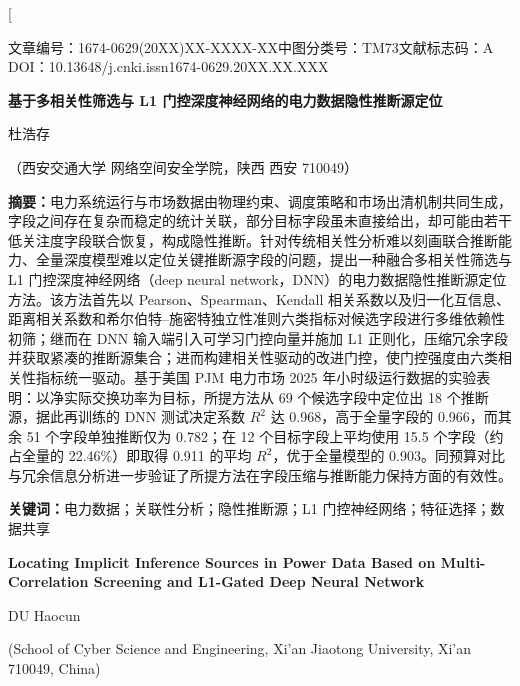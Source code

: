 \documentclass[UTF8,zihao=5,twoside]{ctexart}
\numberwithin{equation}{section}
\newcommand{\articleinfo}{文章编号：1674-0629(20XX)XX-XXXX-XX\quad 中图分类号：TM73\quad 文献标志码：A\\
DOI：10.13648/j.cnki.issn1674-0629.20XX.XX.XXX}
\begin{document}
\twocolumn[

\begin{center}
{\articleinfo}\par\vspace{1.0em}
{\sffamily{}\bfseries 基于多相关性筛选与 L1 门控深度神经网络的电力数据隐性推断源定位}\par\vspace{0.8em}
{杜浩存}\par\vspace{0.4em}
{（西安交通大学 网络空间安全学院，陕西 西安 710049）}\par\vspace{0.8em}
\end{center}

\noindent\textbf{摘要：}电力系统运行与市场数据由物理约束、调度策略和市场出清机制共同生成，字段之间存在复杂而稳定的统计关联，部分目标字段虽未直接给出，却可能由若干低关注度字段联合恢复，构成隐性推断。针对传统相关性分析难以刻画联合推断能力、全量深度模型难以定位关键推断源字段的问题，提出一种融合多相关性筛选与 L1 门控深度神经网络（deep neural network，DNN）的电力数据隐性推断源定位方法。该方法首先以 Pearson、Spearman、Kendall 相关系数以及归一化互信息、距离相关系数和希尔伯特--施密特独立性准则六类指标对候选字段进行多维依赖性初筛；继而在 DNN 输入端引入可学习门控向量并施加 L1 正则化，压缩冗余字段并获取紧凑的推断源集合；进而构建相关性驱动的改进门控，使门控强度由六类相关性指标统一驱动。基于美国 PJM 电力市场 2025 年小时级运行数据的实验表明：以净实际交换功率为目标，所提方法从 69 个候选字段中定位出 18 个推断源，据此再训练的 DNN 测试决定系数 $R^2$ 达 0.968，高于全量字段的 0.966，而其余 51 个字段单独推断仅为 0.782；在 12 个目标字段上平均使用 15.5 个字段（约占全量的 22.46\%）即取得 0.911 的平均 $R^2$，优于全量模型的 0.903。同预算对比与冗余信息分析进一步验证了所提方法在字段压缩与推断能力保持方面的有效性。\par
\noindent\textbf{关键词：}电力数据；关联性分析；隐性推断源；L1 门控神经网络；特征选择；数据共享\par\vspace{0.8em}

\begin{center}
{\bfseries\large Locating Implicit Inference Sources in Power Data Based on Multi-Correlation Screening and L1-Gated Deep Neural Network}\par\vspace{0.5em}
{DU Haocun}\par\vspace{0.3em}
{\small (School of Cyber Science and Engineering, Xi'an Jiaotong University, Xi'an 710049, China)}\par\vspace{0.5em}
\end{center}
\end{document}
